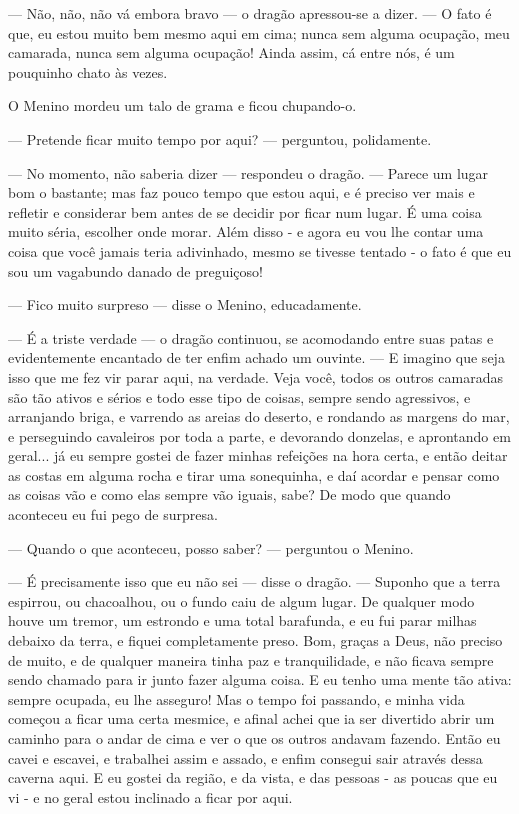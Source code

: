 — Não, não, não vá embora bravo — o dragão apressou-se a dizer. — O
fato é que, eu estou muito bem mesmo aqui em cima; nunca sem alguma
ocupação, meu camarada, nunca sem alguma ocupação! Ainda assim, cá
entre nós, é um pouquinho chato às vezes.

O Menino mordeu um talo de grama e ficou chupando-o. 

— Pretende ficar muito tempo por aqui? — perguntou, polidamente. 

— No momento, não saberia dizer — respondeu o dragão. — Parece um
lugar bom o bastante; mas faz pouco tempo que estou aqui, e é preciso
ver mais e refletir e considerar bem antes de se decidir por ficar
num lugar. É uma coisa muito séria, escolher onde morar. Além disso -
e agora eu vou lhe contar uma coisa que você jamais teria adivinhado,
mesmo se tivesse tentado - o fato é que eu sou um vagabundo danado de
preguiçoso!

— Fico muito surpreso — disse o Menino, educadamente.

— É a triste verdade — o dragão continuou, se acomodando entre suas
patas e evidentemente encantado de ter enfim achado um ouvinte. — E
imagino que seja isso que me fez vir parar aqui, na verdade. Veja
você, todos os outros camaradas são tão ativos e sérios e todo esse
tipo de coisas, sempre sendo agressivos, e arranjando briga, e
varrendo as areias do deserto, e rondando as margens do mar, e
perseguindo cavaleiros por toda a parte, e devorando donzelas, e
aprontando em geral... já eu sempre gostei de fazer minhas refeições
na hora certa, e então deitar as costas em alguma rocha e tirar uma
sonequinha, e daí acordar e pensar como as coisas vão e como elas
sempre vão iguais, sabe? De modo que quando aconteceu eu fui pego de
surpresa.

— Quando o que aconteceu, posso saber? — perguntou o Menino.

— É precisamente isso que eu não sei — disse o dragão. — Suponho que a
terra espirrou, ou chacoalhou, ou o fundo caiu de algum lugar. De
qualquer modo houve um tremor, um estrondo e uma total barafunda, e
eu fui parar milhas debaixo da terra, e fiquei completamente preso.
Bom, graças a Deus, não preciso de muito, e de qualquer maneira tinha
paz e tranquilidade, e não ficava sempre sendo chamado para ir junto
fazer alguma coisa. E eu tenho uma mente tão ativa: sempre ocupada,
eu lhe asseguro! Mas o tempo foi passando, e minha vida começou a
ficar uma certa mesmice, e afinal achei que ia ser divertido abrir um
caminho para o andar de cima e ver o que os outros andavam fazendo.
Então eu cavei e escavei, e trabalhei assim e assado, e enfim
consegui sair através dessa caverna aqui. E eu gostei da região, e da
vista, e das pessoas - as poucas que eu vi - e no geral estou
inclinado a ficar por aqui.

